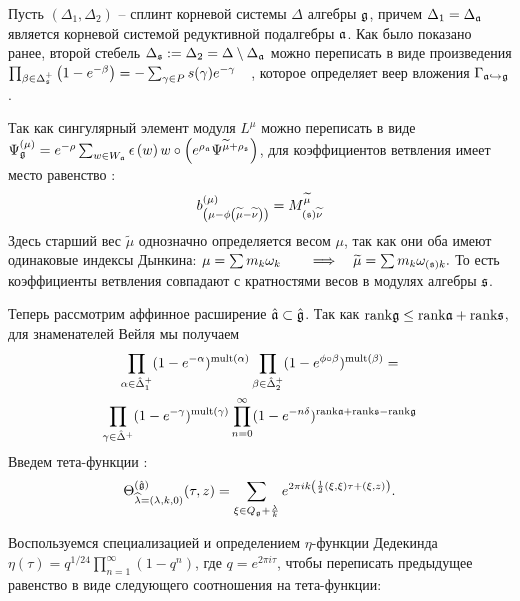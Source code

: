 Пусть $(\Delta_1,\Delta_2)$ -- сплинт корневой системы $\Delta$ алгебры $\mathfrak{g}$, причем $\Delta_1=\Delta_{\mathfrak{a}}$ является корневой системой редуктивной подалгебры $\mathfrak{a}$. Как было показано ранее, второй стебель $\Delta_{\frak{s}}:=\Delta_{2}=\Delta \setminus \Delta_{\mathfrak{a}}$ можно переписать в виде произведения 
$\prod_{\beta \in \Delta _{\frak{s}}^{+}}\left( 1-e^{-\beta }\right)=-\sum_{\gamma \in P}s(\gamma )e^{-\gamma }\quad   \label{splint-product}$, которое определяет веер вложения $\Gamma _{\frak{a}\hookrightarrow \frak{g}}$ \cite{lyakhovsky1996rra,ilyin812pbc,2010arXiv1007.0318L}.

Так как сингулярный элемент модуля $L^{\mu}$ можно переписать в виде $\Psi _{\frak{g}}^{\left( \mu \right) }=e^{-\rho }
\sum_{w\in W_{\frak{a}}}\epsilon \left( w \right) w\circ \left(
e^{\rho _{\frak{a}}}\Psi ^{\widetilde{\mu }+\rho
_{\frak{s}}}\right)$, для коэффициентов ветвления имеет место равенство \cite{2011arXiv1111.6787L}:
\begin{equation}
  \label{eq:146}
b_{\left( \mu -\phi \left( \widetilde{\mu }-\widetilde{\nu }\right) \right)
}^{(\mu )}=M_{\left( \frak{s}\right) \widetilde{\nu }}^{\widetilde{\mu }}  
\end{equation}
Здесь старший вес $\widetilde{\mu }$ однозначно определяется весом $\mu $, так как они оба имеют одинаковые индексы Дынкина: $\mu =\sum m_{k}\omega _{k}\qquad \Longrightarrow \quad \widetilde{\mu }=\sum
m_{k}\omega_{(\mathfrak{s}) k} . \label{new-h-weight}$ То есть коэффициенты ветвления совпадают с кратностями весов в модулях алгебры $\mathfrak{s}$. 

Теперь рассмотрим аффинное расширение $\hat{\mathfrak{a}}\subset\hat{\mathfrak{g}}$. Так как $\mathrm{rank}\mathfrak{g}\leq\mathrm{rank} \mathfrak{a}+\mathrm{rank}\mathfrak{s}$, для знаменателей Вейля мы получаем
\begin{multline}
  \label{eq:129}
\prod_{\alpha\in\hat{\Delta}^{+}_{1}}(1-e^{-\alpha})^{\mathrm{mult}(\alpha)}\prod_{\beta\in\hat{\Delta}^{+}_{2}}(1-e^{\phi\circ \beta})^{\mathrm{mult}(\beta)}=\\
\prod_{\gamma\in\hat{\Delta}^{+}}(1-e^{-\gamma})^{\mathrm{mult}(\gamma)}\prod_{n=0}^{\infty}(1-e^{-n\delta})^{\mathrm{rank}\mathfrak{a}+\mathrm{rank}\mathfrak{s}-\mathrm{rank}\mathfrak{g}}
\end{multline}
Введем тета-функции \cite{kac1984infinite}:
$$\Theta^{(\hat{\mathfrak{g}})}_{\widehat{\lambda}=(\lambda,k,0)}(\tau,z)=\sum_{\xi\in Q_{\mathfrak{g}}+\frac{\lambda}{k}}e^{2\pi i k \left(\frac{1}{2} (\xi,\xi) \tau + (\xi,z)\right)}.$$

Воспользуемся специализацией \cite{kac1988modular,kac1984infinite,kac1990idl} и определением $\eta$-функции Дедекинда
$\eta(\tau)=q^{1/24}\prod_{n=1}^{\infty}(1-q^{n})$, где
$q=e^{2\pi i \tau}$, чтобы переписать предыдущее равенство в виде следующего соотношения на тета-функции:

